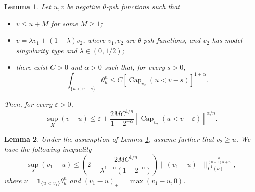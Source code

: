 \documentclass[10pt,a4paper]{amsart}
\newtheorem{lemma}{Lemma}
\newcommand{\capacity}{\mathop{\mathrm{Cap}}\nolimits}
\begin{document}
\begin{lemma}\label{lem sup<cap}
		Let $u, v$ be negative $\theta$-psh functions such that
	\begin{itemize}
		\item $v\leq u+M$ for some $M\geq 1$;
		\item $v=\lambda v_1+(1-\lambda) v_2$, where  $v_1, v_2$ are $\theta$-psh functions, and $v_2$ has model singularity type and $\lambda\in (0, 1/2)$;
		\item there exist $C>0$ and $\alpha>0$ such that, for every $s>0$,
		\begin{equation}\label{eq0lemsup<cap}
			\int_{\{u<v-s\}}\theta_u^n\leq C[\capacity_{v_2}(u<v-s)]^{1+\alpha}.
		\end{equation}
		\end{itemize}
	Then, for every $\varepsilon>0$,
	\begin{equation*}
		\sup_{X }(v-u)\leq \varepsilon+\dfrac{2MC^{1/n}}{1-2^{-\alpha}}[\capacity_{v_2}(u<v-\varepsilon)]^{\alpha/n}.
	\end{equation*}
\end{lemma}

\begin{lemma}\label{lem extend GZ12 prop 5.3} Under the assumption of Lemma \ref{lem sup<cap}, assume further that $v_2\geq u$. We have
the following
	inequality 
$$\sup_{X } (v_1-u)\leq \left(2+\dfrac{2 M C^{1/n}}{\lambda^{1+\alpha}(1-2^{-\alpha})}\right)\|(v_1-u)_+\|_{L^1(\nu)}^{\frac{\alpha}{(n+1)\alpha+n}},$$
where $\nu=\mathbf{1}_{\{u<v_1\}}\theta_u^n$ and $(v_1-u)_+=\max(v_1-u,0)$.
\end{lemma}
\end{document}
